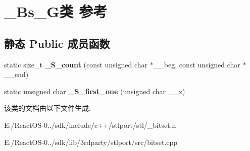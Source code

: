 \hypertarget{class___bs___g}{}\section{\+\_\+\+Bs\+\_\+\+G类 参考}
\label{class___bs___g}
\subsection*{静态 Public 成员函数}
\begin{DoxyCompactItemize}
\item 
\mbox{\label{class___bs___g_a13d6328b254b8afa1c4dc927d49d92ac}} 
static size\+\_\+t {\bfseries \+\_\+\+S\+\_\+count} (const unsigned char $\ast$\+\_\+\+\_\+beg, const unsigned char $\ast$\+\_\+\+\_\+end)
\item 
\mbox{\label{class___bs___g_a0516ae783b3bc783cf558b43f277018b}} 
static unsigned char {\bfseries \+\_\+\+S\+\_\+first\+\_\+one} (unsigned char \+\_\+\+\_\+x)
\end{DoxyCompactItemize}


该类的文档由以下文件生成\+:\begin{DoxyCompactItemize}
\item 
E\+:/\+React\+O\+S-\/0../sdk/include/c++/stlport/stl/\+\_\+bitset.\+h\item 
E\+:/\+React\+O\+S-\/0../sdk/lib/3rdparty/stlport/src/bitset.\+cpp\end{DoxyCompactItemize}
